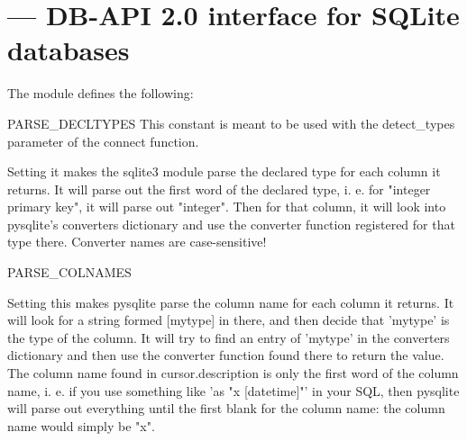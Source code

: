 \section{ ---
         DB-API 2.0 interface for SQLite databases}




The module defines the following:

\begin{datadesc}{PARSE_DECLTYPES}
This constant is meant to be used with the detect_types parameter of the connect function.

Setting it makes the sqlite3 module parse the declared type for each column it
returns.  It will parse out the first word of the declared type, i. e. for
"integer primary key", it will parse out "integer". Then for that column, it
will look into pysqlite's converters dictionary and use the converter function
registered for that type there.  Converter names are case-sensitive!
\end{datadesc}


\begin{datadesc}{PARSE_COLNAMES}

Setting this makes pysqlite parse the column name for each column it returns.
It will look for a string formed [mytype] in there, and then decide that
'mytype' is the type of the column. It will try to find an entry of 'mytype' in
the converters dictionary and then use the converter function found there to
return the value. The column name found in cursor.description is only the first
word of the column name, i.  e. if you use something like 'as "x [datetime]"'
in your SQL, then pysqlite will parse out everything until the first blank for
the column name: the column name would simply be "x".
\end{datadesc}

